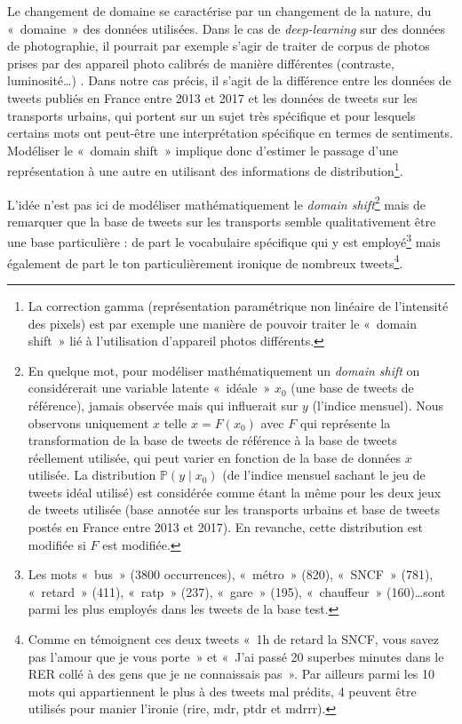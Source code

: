 \documentclass[11pt,french,french]{article}
\let\rmarkdownfootnote\footnote%
\def\footnote{\protect\rmarkdownfootnote}
\begin{document}
Le changement de domaine se caractérise par un changement de la nature, du «~domaine~» des données utilisées.
Dans le cas de \emph{deep-learning} sur des données de photographie, il pourrait par exemple s'agir de traiter de corpus de photos prises par des appareil photo calibrés de manière différentes (contraste, luminosité\dots) .
Dans notre cas précis, il s'agit de la différence entre les données de tweets publiés en France entre 2013 et 2017 et les données de tweets sur les transports urbains, qui portent sur un sujet très spécifique et pour lesquels certains mots ont peut-être une interprétation spécifique en termes de sentiments.
Modéliser le «~domain shift~» implique donc d'estimer le passage d'une représentation à une autre en utilisant des informations de distribution\footnote{La correction gamma (représentation paramétrique non linéaire de l'intensité des pixels) est par exemple une manière de pouvoir traiter le «~domain shift~» lié à l'utilisation d'appareil photos différents.}.

L'idée n'est pas ici de modéliser mathématiquement le \emph{domain shift}\footnote{En quelque mot, pour modéliser mathématiquement un \emph{domain shift} on considérerait une variable latente «~idéale~» \(x_0\) (une base de tweets de référence), jamais observée mais qui influerait sur \(y\) (l'indice mensuel).
  Nous observons uniquement \(x\) telle \(x=F(x_0)\) avec \(F\) qui représente la transformation de la base de tweets de référence à la base de tweets réellement utilisée, qui peut varier en fonction de la base de données \(x\) utilisée.
  La distribution \(\mathbb P(y\mid x_0)\) (de l'indice mensuel sachant le jeu de tweets idéal utilisé) est considérée comme étant la même pour les deux jeux de tweets utilisée (base annotée sur les transports urbains et base de tweets postés en France entre 2013 et 2017).
  En revanche, cette distribution est modifiée si \(F\) est modifiée.} mais de remarquer que la base de tweets sur les transports semble qualitativement être une base particulière : de part le vocabulaire spécifique qui y est employé\footnote{Les mots «~bus~» (3800 occurrences), «~métro~» (820), «~SNCF~» (781), «~retard~» (411), «~ratp~» (237), «~gare~» (195), «~chauffeur~» (160)\dots sont parmi les plus employés dans les tweets de la base test.} mais également de part le ton particulièrement ironique de nombreux tweets\footnote{Comme en témoignent ces deux tweets «~1h de retard la SNCF, vous savez pas l'amour que je vous porte~» et «~J'ai passé 20 superbes minutes dans le RER collé à des gens que je ne connaissais pas~».
  Par ailleurs parmi les 10 mots qui appartiennent le plus à des tweets mal prédits, 4 peuvent être utilisés pour manier l'ironie (rire, mdr, ptdr et mdrrr).}.
\end{document}
